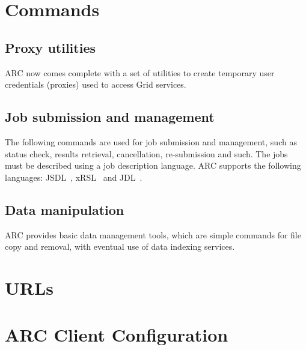 \documentclass{book}
\begin{document}
\chapter{Commands} \label{sec:cli} 

\section{Proxy utilities} \label{sec:proxy}
 ARC now comes complete with a set of utilities to create
temporary user credentials (proxies) used to access Grid services.



\section{Job submission and management} \label{sec:ui} 
The following commands are used for job submission and management,
such as status check, results retrieval, cancellation, re-submission
and such. The jobs must be described using a job description language. ARC
supports the following languages: JSDL~\cite{jsdl}, xRSL~\cite{xrsl} and
JDL~\cite{jdl}.



\section{Data manipulation} \label{sec:dm} 
 ARC provides basic data management tools,
which are simple commands for file copy and removal, with eventual use
of data indexing services.





%

%


\chapter{URLs}\label{sec:urls}


\chapter{ARC Client Configuration} \label{sec:client.conf} 



\printindex
\end{document}
